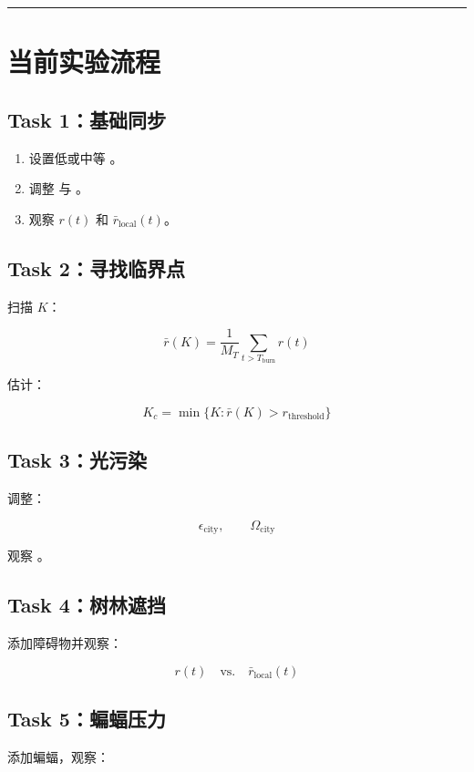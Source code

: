 \documentclass[UTF8]{ctexart}
\begin{document}
\bigskip
\hrule
\bigskip

\section{当前实验流程}

\subsection{Task 1：基础同步}

\begin{enumerate}
\item 设置低或中等 \texttt{}。
\item 调整 \texttt{} 与 \texttt{}。
\item 观察 $r(t)$ 和 $\bar r_{\text{local}}(t)$。
\end{enumerate}

\subsection{Task 2：寻找临界点}

扫描 $K$：

\[
\bar r(K)
=
\frac{1}{M_T}
\sum_{t>T_{\text{burn}}}
r(t)
\]

估计：

\[
K_c=\min\{K:\bar r(K)>r_{\text{threshold}}\}
\]

\subsection{Task 3：光污染}

调整：

\[
\epsilon_{\text{city}},
\qquad
\Omega_{\text{city}}
\]

观察 \texttt{}。

\subsection{Task 4：树林遮挡}

添加障碍物并观察：

\[
r(t)
\quad\text{vs.}\quad
\bar r_{\text{local}}(t)
\]

\subsection{Task 5：蝙蝠压力}

添加蝙蝠，观察：
\end{document}
